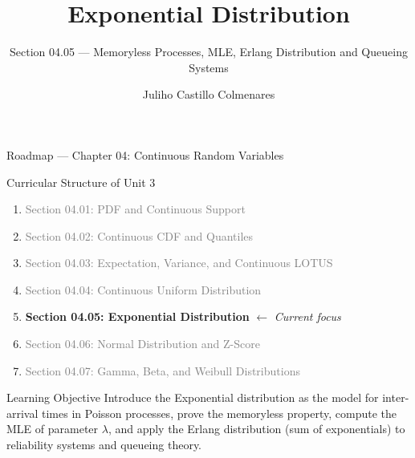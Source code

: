 \documentclass[aspectratio=169,xcolor={dvipsnames,table}]{beamer}
\title{Exponential Distribution}
\subtitle{Section 04.05 --- Memoryless Processes, MLE, Erlang Distribution and Queueing Systems}
\author[J. Castillo Colmenares]{Juliho Castillo Colmenares}
\institute[Tec de Monterrey]{Tecnologico de Monterrey}
\date{\vspace{-1.5cm}}
\begin{document}
\begin{frame}[plain]
	\titlepage
\end{frame}

\begin{frame}{Roadmap --- Chapter 04: Continuous Random Variables}
	\vspace{-0.15cm}
	\begin{block}{Curricular Structure of Unit 3}
		\footnotesize
		\begin{enumerate}\itemsep=0.03cm
			\item \textcolor{gray}{Section 04.01: PDF and Continuous Support}
			\item \textcolor{gray}{Section 04.02: Continuous CDF and Quantiles}
			\item \textcolor{gray}{Section 04.03: Expectation, Variance, and Continuous LOTUS}
			\item \textcolor{gray}{Section 04.04: Continuous Uniform Distribution}
			\item \textbf{\textcolor{TecRojo}{Section 04.05: Exponential Distribution}} $\leftarrow$ \emph{Current focus}
			\item \textcolor{gray}{Section 04.06: Normal Distribution and Z-Score}
			\item \textcolor{gray}{Section 04.07: Gamma, Beta, and Weibull Distributions}
		\end{enumerate}
	\end{block}
	\vspace{-0.2cm}
	\begin{alertblock}{Learning Objective}
		\scriptsize
		Introduce the Exponential distribution as the model for inter-arrival times in Poisson processes, prove the memoryless property, compute the MLE of parameter $\lambda$, and apply the Erlang distribution (sum of exponentials) to reliability systems and queueing theory.
	\end{alertblock}
\end{frame}
\end{document}
